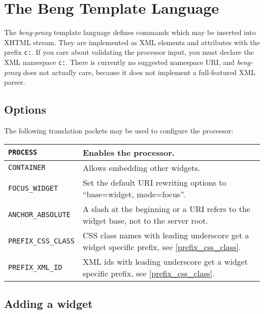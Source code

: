 \documentclass[a4paper,12pt]{article}
\begin{document}
\section{The Beng Template Language}
\label{processor}

The \emph{beng-proxy} template language defines commands which may be
inserted into XHTML stream.  They are implemented as XML elements and
attributes with the prefix \texttt{c:}.  If you care about validating
the processor input, you must declare the XML namespace \texttt{c:}.
There is currently no suggested namespace URI, and \emph{beng-proxy}
does not actually care, because it does not implement a full-featured
XML parser.

\subsection{Options}

The following translation packets may be used to configure the
processor:

\begin{longtable}{|l|p{8cm}|}
\hline

\verb|PROCESS| & Enables the processor. \\

\hline

\verb|CONTAINER| & Allows embedding other widgets. \\

\hline

\texttt{FOCUS\_WIDGET} & Set the default URI rewriting options to
``base=widget, mode=focus''. \\

\hline

\verb|ANCHOR_ABSOLUTE| & A slash at the beginning or a URI refers to
the widget base, not to the server root. \\

\hline

\verb|PREFIX_CSS_CLASS| & CSS class names with leading underscore
get a widget specific prefix, see \ref{prefix_css_class}. \\

\hline

\verb|PREFIX_XML_ID| & XML ids with leading underscore get a widget
specific prefix, see \ref{prefix_css_class}. \\

\hline
\end{longtable}


\subsection{Adding a widget}
\end{document}
